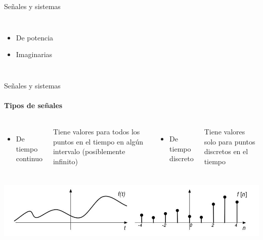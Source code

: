 \begin{darkframes}
\begin{frame}{Señales y sistemas}
\begin{columns}[onlytextwidth]
\begin{itemize}
               \item{De potencia}
               \item{Imaginarias}
            \end{itemize}
      \end{columns}
    \end{frame}
    \begin{frame}{Señales y sistemas}
      \framesubtitle{Tipos de señales}
      \begin{columns}[onlytextwidth]
            \begin{itemize}
               \item{De tiempo continuo}
      \end{itemize}
            Tiene valores para todos los puntos en el tiempo en algún intervalo (posiblemente infinito)
            \begin{itemize}
               \item{De tiempo discreto}
            \end{itemize}
         Tiene valores solo para puntos discretos en el tiempo
         \end{columns}
      \vfill
      \includegraphics[width=\textwidth]{1_clase/continuo_vs_discreto}
    \end{frame}


\end{darkframes}
